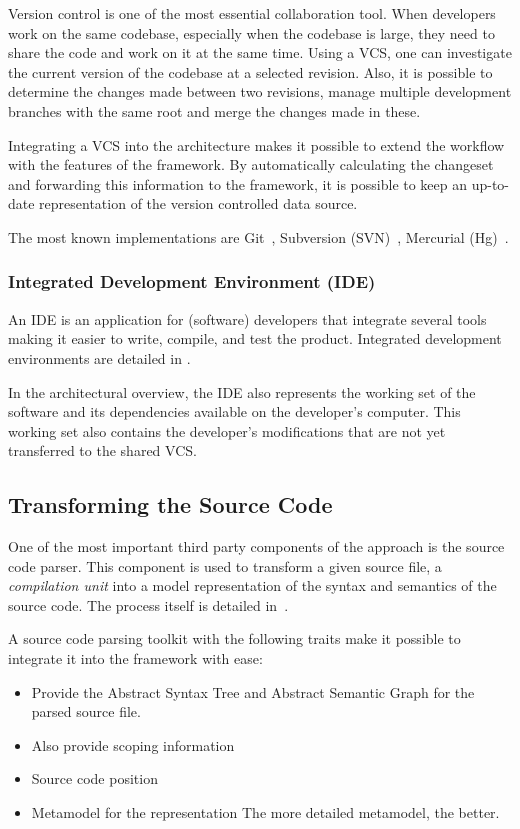 Version control is one of the most essential collaboration tool. When developers work on the same codebase, especially when the codebase is large, they need to share the code and work on it at the same time. Using a VCS, one can investigate the current version of the codebase at a selected revision. Also, it is possible to determine the changes made between two revisions, manage multiple development branches with the same root and merge the changes made in these.

Integrating a VCS into the architecture makes it possible to extend the workflow with the features of the framework. By automatically calculating the changeset and forwarding this information to the framework, it is possible to keep an up-to-date representation of the version controlled data source.

The most known implementations are Git~\cite{git}, Subversion (SVN)~\cite{svn}, Mercurial (Hg)~\cite{hg}.

\subsubsection{Integrated Development Environment (IDE)}
An IDE is an application for (software) developers that integrate several tools making it easier to write, compile, and test the product. Integrated development environments are detailed in .

In the architectural overview, the IDE also represents the working set of the software and its dependencies available on the developer's computer. This working set also contains the developer's modifications that are not yet transferred to the shared VCS.


\subsection{Transforming the Source Code}
\label{sect:overview-transforming-the-source-code}
One of the most important third party components of the approach is the source code parser. This component is used to transform a given source file, a \emph{compilation unit} into a model representation of the syntax and semantics of the source code. The process itself is detailed in~.

A source code parsing toolkit with the following traits make it possible to integrate it into the framework with ease:

\begin{itemize}[topsep=0pt]
  \item Provide the Abstract Syntax Tree and Abstract Semantic Graph for the parsed source file.

  \item Also provide scoping information

  \item Source code position

  \item Metamodel for the representation
  The more detailed metamodel, the better.
\end{itemize}

